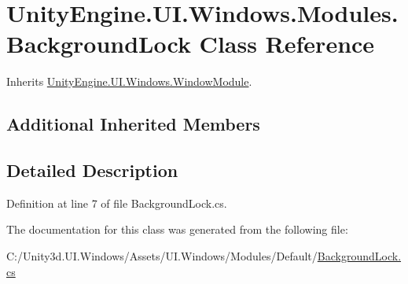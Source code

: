 \hypertarget{class_unity_engine_1_1_u_i_1_1_windows_1_1_modules_1_1_background_lock}{}\section{Unity\+Engine.\+U\+I.\+Windows.\+Modules.\+Background\+Lock Class Reference}
\label{class_unity_engine_1_1_u_i_1_1_windows_1_1_modules_1_1_background_lock}


Inherits \hyperlink{class_unity_engine_1_1_u_i_1_1_windows_1_1_window_module}{Unity\+Engine.\+U\+I.\+Windows.\+Window\+Module}.

\subsection*{Additional Inherited Members}


\subsection{Detailed Description}


Definition at line 7 of file Background\+Lock.\+cs.



The documentation for this class was generated from the following file\+:\begin{DoxyCompactItemize}
\item 
C\+:/\+Unity3d.\+U\+I.\+Windows/\+Assets/\+U\+I.\+Windows/\+Modules/\+Default/\hyperlink{_background_lock_8cs}{Background\+Lock.\+cs}\end{DoxyCompactItemize}
